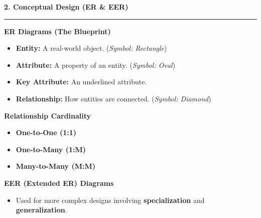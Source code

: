 \documentclass[a4paper, 8pt]{extarticle}
\newcommand{\sectionheading}[1]{\large\textbf{#1}\par\noindent\rule{\linewidth}{0.4pt}}
\newcommand{\subsectionheading}[1]{\normalsize\textbf{#1}}
\begin{document}
\begin{multicols}{2}
\vspace{1em}
\sectionheading{2. Conceptual Design (ER & EER)}
\vspace{0.5em}
\subsectionheading{ER Diagrams (The Blueprint)}
\begin{itemize}
    \item \textbf{Entity:} A real-world object. (\textit{Symbol: Rectangle})
    \item \textbf{Attribute:} A property of an entity. (\textit{Symbol: Oval})
    \item \textbf{Key Attribute:} An underlined attribute.
    \item \textbf{Relationship:} How entities are connected. (\textit{Symbol: Diamond})
\end{itemize}
\subsectionheading{Relationship Cardinality}
\begin{itemize}
    \item \textbf{One-to-One (1:1)}
    \item \textbf{One-to-Many (1:M)}
    \item \textbf{Many-to-Many (M:M)}
\end{itemize}
\subsectionheading{EER (Extended ER) Diagrams}
\begin{itemize}
    \item Used for more complex designs involving \textbf{specialization} and \textbf{generalization}.
\end{itemize}


\end{multicols}
\end{document}
